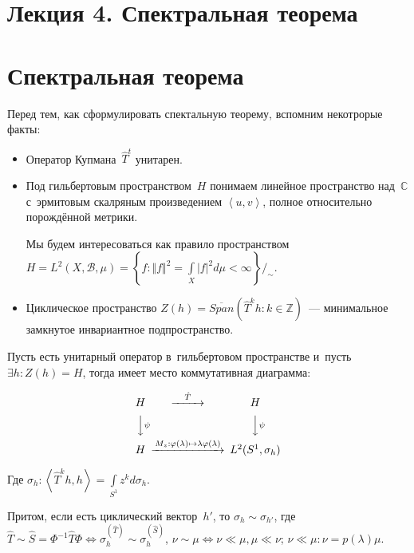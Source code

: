 \documentclass{article}
\begin{document}
\section*{Лекция 4. Спектральная теорема}
\resetcntrs

\section{Спектральная теорема}

Перед тем, как сформулировать спектальную теорему, вспомним некотрорые факты:
\begin{itemize}
	\item Оператор Купмана~$\hat T^t$ унитарен.
	\item Под гильбертовым пространством~$H$ понимаем линейное пространство
		над~$\mathbb{C}$ с~эрмитовым скалряным произведением $\left< u, v \right>$,
		полное относительно порождённой метрики.

		Мы будем интересоваться как правило пространством~$H = L^2(X, \mathcal{B},
		\mu) = \left\{f: \Vert f \Vert^2 = \int\limits_X |f|^2 d\mu < \infty
		\right\} /_\sim$.
	\item Циклическое пространство $Z(h) = \overline{Span}(\hat T^k h: k \in
		\mathbb{Z})$~--- минимальное замкнутое инвариантное подпространство.
\end{itemize}

\begin{theorem}
	Пусть есть унитарный оператор в~гильбертовом пространстве и~пусть $\exists h:
	Z(h) = H$, тогда имеет место коммутативная диаграмма:

	$$\begin{CD}
	H           @>\hat T>>  H\\
	@VV\psi V              @VV\psi V\\
	H @> M_z: \phi(\lambda) \mapsto \lambda \phi(\lambda) >> L^2(S^1,\sigma_h)
	\end{CD}$$

	Где $\sigma_h: \left<\hat T^kh, h\right> = \int\limits_{S^1} z^k d\sigma_h$.

	Притом, если есть циклический вектор~$h'$, то $\sigma_h \sim \sigma_{h'}$, где
	$\hat T \sim \hat S = \Phi^{-1} \hat T \Phi \Leftrightarrow \sigma^{(\hat
	T)}_h \sim \sigma^{(\hat S)}_h$, $\nu \sim \mu \Leftrightarrow \nu \ll \mu,
	\mu \ll \nu$; $\nu \ll \mu: \nu = p(\lambda) \mu$.
\end{theorem}
\end{document}
